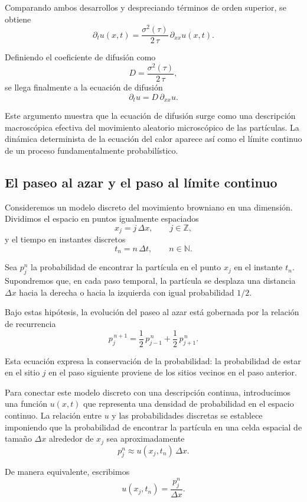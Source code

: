 \documentclass[12pt, a4paper]{amsbook}
\theoremstyle{remark}
\theoremstyle{definition}
\numberwithin{section}{chapter}
\numberwithin{subsection}{section}
\numberwithin{equation}{section}
\numberwithin{figure}{chapter}
\begin{document}
Comparando ambos desarrollos y despreciando términos de orden superior, se obtiene
$$
\partial_t u(x,t) = \frac{\sigma^2(\tau)}{2\,\tau}\,\partial_{xx} u(x,t).
$$

Definiendo el coeficiente de difusión como
$$
D = \frac{\sigma^2(\tau)}{2\,\tau},
$$
se llega finalmente a la ecuación de difusión
$$
\partial_t u = D\,\partial_{xx} u.
$$

\medskip

Este argumento muestra que la ecuación de difusión surge como una descripción macroscópica efectiva del movimiento aleatorio microscópico de las partículas. La dinámica determinista de la ecuación del calor aparece así como el límite continuo de un proceso fundamentalmente probabilístico.

\subsection{El paseo al azar y el paso al límite continuo}

Consideremos un modelo discreto del movimiento browniano en una dimensión. Dividimos el espacio en puntos igualmente espaciados
$$
x_j = j\,\Delta x, \qquad j \in \mathbb{Z},
$$
y el tiempo en instantes discretos
$$
t_n = n\,\Delta t, \qquad n \in \mathbb{N}.
$$

Sea $p_j^n$ la probabilidad de encontrar la partícula en el punto $x_j$ en el instante $t_n$. Supondremos que, en cada paso temporal, la partícula se desplaza una distancia $\Delta x$ hacia la derecha o hacia la izquierda con igual probabilidad $1/2$.

Bajo estas hipótesis, la evolución del paseo al azar está gobernada por la relación de recurrencia
$$
p_j^{\,n+1} = \frac{1}{2}\,p_{j-1}^{\,n} + \frac{1}{2}\,p_{j+1}^{\,n}.
$$

Esta ecuación expresa la conservación de la probabilidad: la probabilidad de estar en el sitio $j$ en el paso siguiente proviene de los sitios vecinos en el paso anterior.

Para conectar este modelo discreto con una descripción continua, introducimos una función $u(x,t)$ que representa una densidad de probabilidad en el espacio continuo. La relación entre $u$ y las probabilidades discretas se establece imponiendo que la probabilidad de encontrar la partícula en una celda espacial de tamaño $\Delta x$ alrededor de $x_j$ sea aproximadamente
$$
p_j^n \approx u(x_j,t_n)\,\Delta x.
$$

De manera equivalente, escribimos
$$
u(x_j,t_n) = \frac{p_j^n}{\Delta x}.
$$
\end{document}
